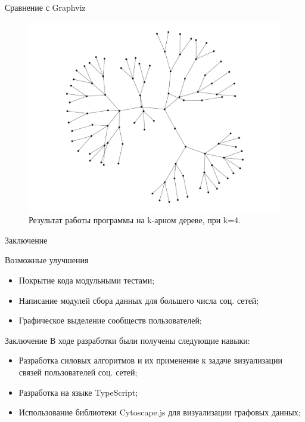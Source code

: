\documentclass{beamer}
\begin{document}
\begin{frame}{Сравнение с Graphviz}
\begin{figure}[H]
\begin{minipage}[t]{.32\textwidth}
			\caption*{алгоритм Камады-Кавай}
		\end{minipage}
		\begin{minipage}[t]{.32\textwidth}
			\centering
			\includegraphics[width=\linewidth]{./imgs/quad_tree_gv.png}
			\caption*{Graphviz}
		\end{minipage}
		\caption{Результат работы программы на k-арном дереве, при k=4.}
	\end{figure}
\end{frame}

\begin{frame}{Заключение}
  \begin{alertblock}{Возможные улучшения}
  \begin{itemize}
    \item Покрытие кода модульными тестами;
    \item Написание модулей сбора данных для большего числа соц. сетей;
    \item Графическое выделение сообществ пользователей;
  \end{itemize}
  \end{alertblock}
\end{frame}

\begin{frame}{Заключение}
  В ходе разработки были получены следующие навыки:
    \begin{itemize}
      \item Разработка силовых алгоритмов и их применение к задаче визуализации связей пользователей соц. сетей;
      \item Разработка на языке TypeScript;
      \item Использование библиотеки Cytoscape.js для визуализации графовых данных;
    \end{itemize}
\end{frame}
\end{document}
